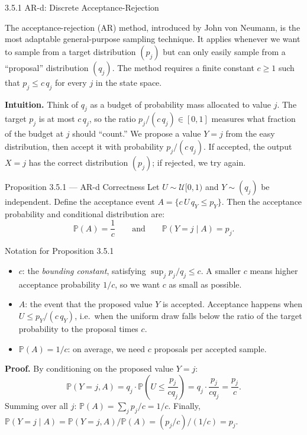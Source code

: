 \documentclass[aspectratio=169,10pt]{beamer}
\newcommand{\PP}{\mathbb{P}}
\newcommand{\UU}{\mathcal{U}}
\begin{document}
\begin{frame}[allowframebreaks]{3.5.1 AR-d: Discrete Acceptance-Rejection}

The acceptance-rejection (AR) method, introduced by John von Neumann, is the
most adaptable general-purpose sampling technique.  It applies whenever we want
to sample from a target distribution $(p_j)$ but can only easily sample from
a ``proposal'' distribution $(q_j)$.  The method requires a finite constant
$c \ge 1$ such that $p_j \le c \, q_j$ for every $j$ in the state space.

\textbf{Intuition.}  Think of $q_j$ as a budget of probability mass allocated
to value $j$.  The target $p_j$ is at most $c \, q_j$, so the ratio
$p_j/(c \, q_j) \in [0,1]$ measures what fraction of the budget at $j$ should
``count.''  We propose a value $Y = j$ from the easy distribution, then
accept it with probability $p_j/(c \, q_j)$.  If accepted, the output $X = j$
has the correct distribution $(p_j)$; if rejected, we try again.

\begin{block}{Proposition 3.5.1 --- AR-d Correctness}
  Let $U \sim \UU[0,1)$ and $Y \sim (q_j)$ be independent.
  Define the acceptance event $A = \{c \, U \, q_Y \le p_Y\}$.
  Then the acceptance probability and conditional distribution are:
  \[
    \PP(A) = \frac{1}{c} \qquad \text{and} \qquad \PP(Y = j \mid A) = p_j.
  \]
\end{block}

\begin{block}{Notation for Proposition 3.5.1}
  \begin{itemize}
    \item $c$: the \emph{bounding constant}, satisfying $\sup_j p_j/q_j \le c$.
      A smaller $c$ means higher acceptance probability $1/c$, so we want
      $c$ as small as possible.
    \item $A$: the event that the proposed value $Y$ is accepted.
      Acceptance happens when $U \le p_Y/(c \, q_Y)$, i.e.\ when the uniform
      draw falls below the ratio of the target probability to the proposal times $c$.
    \item $\PP(A) = 1/c$: on average, we need $c$ proposals per accepted sample.
  \end{itemize}
\end{block}

\textbf{Proof.}  By conditioning on the proposed value $Y = j$:
\[
  \PP(Y = j, A)
  = q_j \cdot \PP\!\left(U \le \frac{p_j}{c q_j}\right)
  = q_j \cdot \frac{p_j}{c q_j}
  = \frac{p_j}{c}.
\]
Summing over all $j$: $\PP(A) = \sum_j p_j/c = 1/c$.
Finally, $\PP(Y = j \mid A) = \PP(Y = j, A)/\PP(A) = (p_j/c)/(1/c) = p_j$.


\end{frame}
\end{document}
